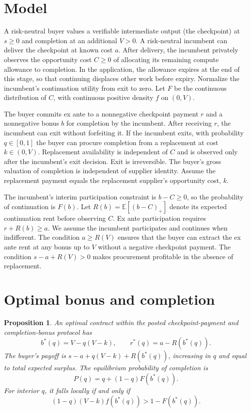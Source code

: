 \documentclass[11pt]{article}
\newtheorem{proposition}{Proposition}
\begin{document}
\section{Model}
A risk-neutral buyer values a verifiable intermediate output (the checkpoint) at $s\geq 0$ and completion at an additional $V>0$. A risk-neutral incumbent can deliver the checkpoint at known cost $a$. After delivery, the incumbent privately observes the opportunity cost $C\geq 0$ of allocating its remaining compute allowance to completion. In the application, the allowance expires at the end of this stage, so that continuing displaces other work before expiry. Normalize the incumbent's continuation utility from exit to zero. Let $F$ be the continuous distribution of $C$, with continuous positive density $f$ on $(0,V)$.

The buyer commits ex ante to a nonnegative checkpoint payment $r$ and a nonnegative bonus $b$ for completion by the incumbent. After receiving $r$, the incumbent can exit without forfeiting it. If the incumbent exits, with probability $q\in[0,1]$ the buyer can procure completion from a replacement at cost $k\in(0,V)$. Replacement availability is independent of $C$ and is observed only after the incumbent's exit decision. Exit is irreversible. The buyer's gross valuation of completion is independent of supplier identity. Assume the replacement payment equals the replacement supplier's opportunity cost, $k$.

The incumbent's interim participation constraint is $b-C\geq 0$, so the probability of continuation is $F(b)$. Let $R(b)=\mathbb E[(b-C)_+]$ denote its expected continuation rent before observing $C$. Ex ante participation requires $r+R(b)\geq a$. We assume the incumbent participates and continues when indifferent. The condition $a\geq R(V)$ ensures that the buyer can extract the ex ante rent at any bonus up to $V$ without a negative checkpoint payment. The condition $s-a+R(V)>0$ makes procurement profitable in the absence of replacement.
\section{Optimal bonus and completion}
\begin{proposition}
An optimal contract within the posted checkpoint-payment and completion-bonus protocol has
\[
 b^*(q)=V-q(V-k),\qquad r^*(q)=a-R(b^*(q)).
\]
The buyer's payoff is $s-a+q(V-k)+R(b^*(q))$, increasing in $q$ and equal to total expected surplus. The equilibrium probability of completion is
\[
 P(q)=q+(1-q)F(b^*(q)).
\]
For interior $q$, it falls locally if and only if
\[
 (1-q)(V-k)f(b^*(q))>1-F(b^*(q)).
\]
\end{proposition}
\end{document}
